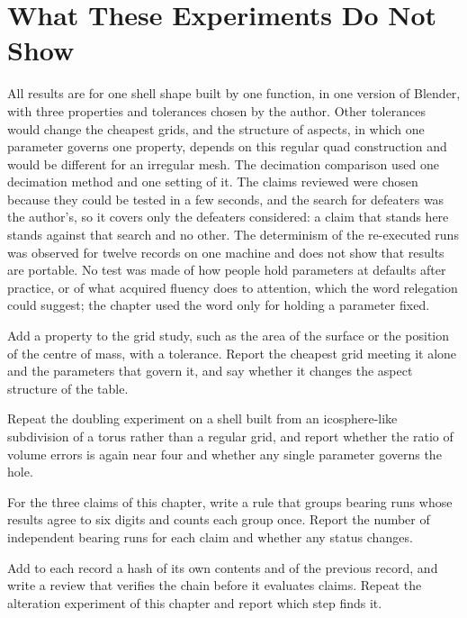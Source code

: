 \section{What These Experiments Do Not Show}

All results are for one shell shape built by one function, in one version of Blender, with three properties and tolerances chosen by the author. Other tolerances would change the cheapest grids, and the structure of aspects, in which one parameter governs one property, depends on this regular quad construction and would be different for an irregular mesh. The decimation comparison used one decimation method and one setting of it. The claims reviewed were chosen because they could be tested in a few seconds, and the search for defeaters was the author's, so it covers only the defeaters considered: a claim that stands here stands against that search and no other. The determinism of the re-executed runs was observed for twelve records on one machine and does not show that results are portable. No test was made of how people hold parameters at defaults after practice, or of what acquired fluency does to attention, which the word relegation could suggest; the chapter used the word only for holding a parameter fixed.

\begin{exercise}
Add a property to the grid study, such as the area of the surface or the position of the centre of mass, with a tolerance. Report the cheapest grid meeting it alone and the parameters that govern it, and say whether it changes the aspect structure of the table.
\end{exercise}

\begin{exercise}
Repeat the doubling experiment on a shell built from an icosphere-like subdivision of a torus rather than a regular grid, and report whether the ratio of volume errors is again near four and whether any single parameter governs the hole.
\end{exercise}

\begin{exercise}
For the three claims of this chapter, write a rule that groups bearing runs whose results agree to six digits and counts each group once. Report the number of independent bearing runs for each claim and whether any status changes.
\end{exercise}

\begin{exercise}
Add to each record a hash of its own contents and of the previous record, and write a review that verifies the chain before it evaluates claims. Repeat the alteration experiment of this chapter and report which step finds it.
\end{exercise}
